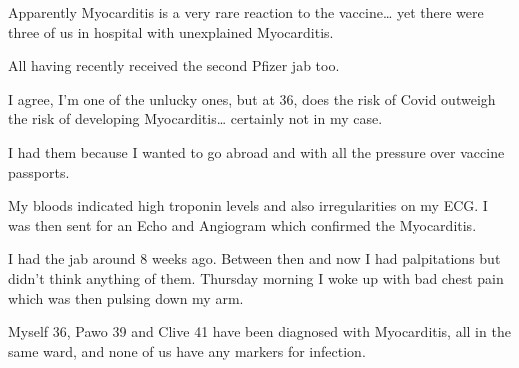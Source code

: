 Apparently Myocarditis is a very rare reaction to the vaccine… yet there were
three of us in hospital with unexplained Myocarditis.

All having recently received the second Pfizer jab too.

I agree, I’m one of the unlucky ones, but at 36, does the risk of Covid outweigh
the risk of developing Myocarditis… certainly not in my case.

I had them because I wanted to go abroad and with all the pressure over vaccine
passports.

My bloods indicated high troponin levels and also irregularities on my ECG. I
was then sent for an Echo and Angiogram which confirmed the Myocarditis.

I had the jab around 8 weeks ago. Between then and now I had palpitations but
didn’t think anything of them. Thursday morning I woke up with bad chest pain
which was then pulsing down my arm.

Myself 36, Pawo 39 and Clive 41 have been diagnosed with Myocarditis, all in the
same ward, and none of us have any markers for infection.

